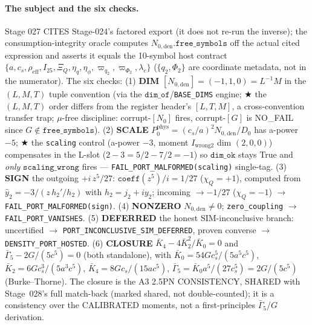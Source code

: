 \paragraph{The subject and the six checks.}
Stage 027 CITES Stage-024's factored export (it does not re-run the inverse); the consumption-integrity oracle computes
\(N_{0,\mathrm{den}}.\texttt{free\_symbols}\) off the actual cited expression and asserts it equals the 10-symbol host
contract \(\{a,c_s,\rho_{\mathrm{eff}},I_{25},\Xi_Q,\eta_q,\eta_\phi,\varpi_{q_2},\varpi_{\Phi_2},\lambda_c\}\)
(\(\{q_2,\Phi_2\}\) are coordinate metadata, not in the numerator). The six checks: (1) \textbf{DIM}
\([N_{0,\mathrm{den}}]=(-1,1,0)=L^{-1}M\) in the \((L,M,T)\) tuple convention (via the \(\texttt{dim\_of}\)/\texttt{BASE\_DIMS}
engine; \(\bigstar\) the \((L,M,T)\) order differs from the register header's \([L,T,M]\), a cross-convention transfer trap;
\(\mu\)-free discipline: corrupt-\([N_0]\) fires, corrupt-\([G]\) is NO\_FAIL since \(G\notin\texttt{free\_symbols}\)).
(2) \textbf{SCALE} \(P_0^{\mathrm{phys}}=(c_s/a)^2 N_{0,\mathrm{den}}/D_0\) has a-power \(-5\); \(\bigstar\) the \texttt{scaling}
control (a-power \(-3\), moment \(I_{\mathrm{wrong2}}\) dim \((2,0,0)\)) compensates in the L-slot
(\(2-3=5/2-7/2=-1\)) so \(\texttt{dim\_ok}\) stays True and \emph{only} \(\texttt{scaling\_wrong}\) fires ---
\texttt{FAIL\_PORT\_MALFORMED(scaling)} single-tag. (3) \textbf{SIGN} the outgoing \(+i\,z^5/27\): \(\texttt{coeff}(z^5)/i=1/27\)
(\(\chi_Q=+1\)), computed from \(\hat y_2=-3/(z\,h_2'/h_2)\) with \(h_2=j_2+i y_2\); incoming \(\to -1/27\)
(\(\chi_Q=-1\)) \(\to\) \texttt{FAIL\_PORT\_MALFORMED(sign)}. (4) \textbf{NONZERO} \(N_{0,\mathrm{den}}\neq0\); \texttt{zero\_coupling}
\(\to\) \texttt{FAIL\_PORT\_VANISHES}. (5) \textbf{DEFERRED} the honest SIM-inconclusive branch: uncertified \(\to\)
\texttt{PORT\_INCONCLUSIVE\_SIM\_DEFERRED}, proven converse \(\to\) \texttt{DENSITY\_PORT\_HOSTED}. (6) \textbf{CLOSURE}
\(\bar K_4-4\bar K_2^2/\bar K_0=0\) and \(\bar\Gamma_5-2G/(5c^5)=0\) (both standalone), with \(\bar K_0=54Gc_s^5/(5a^5c^5)\),
\(\bar K_2=6Gc_s^3/(5a^3c^5)\), \(\bar K_4=8Gc_s/(15ac^5)\), \(\bar\Gamma_5=\bar K_0 a^5/(27c_s^5)=2G/(5c^5)\)
(Burke--Thorne). The closure is the A3 2.5PN CONSISTENCY, SHARED with Stage~028's full match-back (marked shared, not
double-counted); it is a consistency over the CALIBRATED moments, not a first-principles \(\bar\Gamma_5\)/\(G\) derivation.

